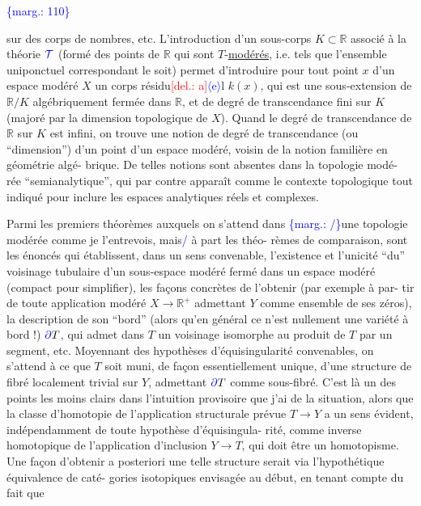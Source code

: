 \documentclass[11pt]{article}
\newcommand{\scanpage}[1]{\par\bigskip\noindent{\small\sffamily[scan #1]}\par}
\newcommand{\mspage}[1]{{\small\sffamily[p.\,#1]}}
\newcommand{\hand}[1]{\textcolor{blue}{#1}}
\newcommand{\inserted}[2][]{\textcolor{blue}{$\langle$#2$\rangle$}}
\newcommand{\margin}[1]{\textcolor{blue}{\{\textsf{marg.:} #1\}}}
\newcommand{\deleted}[1]{\textcolor{red}{[\textsf{del.:} #1]}}
\newcommand{\uline}[1]{\underline{#1}}
\begin{document}
\margin{110}

\clearpage
\scanpage{119/111}
\mspage{33}

sur des corps de nombres, etc. L'introduction d'un sous-corps
$K \subset \mathbb{R}$ associé à la théorie $\hand{\mathcal{T}}$ (formé des points de $\mathbb{R}$ qui sont
$T$-\uline{modérés}, i.e. tels que l'ensemble uniponctuel correspondant le
soit) permet d'introduire pour tout point $x$ d'un espace modéré
$X$ un corps résidu\deleted{a}\inserted{e}l $k(x)$, qui est une sous-extension de $\mathbb{R}/K$
algébriquement fermée dans $\mathbb{R}$, et de degré de transcendance fini
sur $K$ (majoré par la dimension topologique de $X$). Quand le
degré de transcendance de $\mathbb{R}$ sur $K$ est infini, on trouve une
notion de degré de transcendance (ou ``dimension'') d'un point d'un
espace modéré, voisin de la notion familière en géométrie algé-%
brique. De telles notions sont absentes dans la topologie modé-%
rée ``semianalytique'', qui par contre apparaît comme le contexte
topologique tout indiqué pour inclure les espaces analytiques réels
et complexes.

Parmi les premiers théorèmes auxquels on s'attend dans
\margin{/}une topologie modérée comme je l'entrevois, mais\hand{/} à part les théo-%
rèmes de comparaison, sont les énoncés qui établissent, dans un
sens convenable, l'existence et l'unicité ``du'' voisinage tubulaire
d'un sous-espace modéré fermé dans un espace modéré (compact pour
simplifier), les façons concrètes de l'obtenir (par exemple à par-%
tir de toute application modéré $X \longrightarrow \mathbb{R}^{+}$ admettant $Y$ comme
ensemble de ses zéros), la description de son ``bord'' (alors qu'en
général ce n'est nullement une variété à bord !) $\hand{\partial}T$, qui admet
dans $T$ un voisinage isomorphe au produit de $T$ par un segment,
etc. Moyennant des hypothèses d'équisingularité convenables, on
s'attend à ce que $T$ soit muni, de façon essentiellement unique,
d'une structure de fibré localement trivial sur $Y$, admettant $\hand{\partial}T$
comme sous-fibré. C'est là un des points les moins clairs dans
l'intuition provisoire que j'ai de la situation, alors que la
classe d'homotopie de l'application structurale prévue $T \longrightarrow Y$
a un sens évident, indépendamment de toute hypothèse d'équisingula-%
rité, comme inverse homotopique de l'application d'inclusion $Y \longrightarrow T$,
qui doit être un homotopisme. Une façon d'obtenir a posteriori
une telle structure serait via l'hypothétique équivalence de caté-%
gories isotopiques envisagée au début, en tenant compte du fait que
\end{document}
